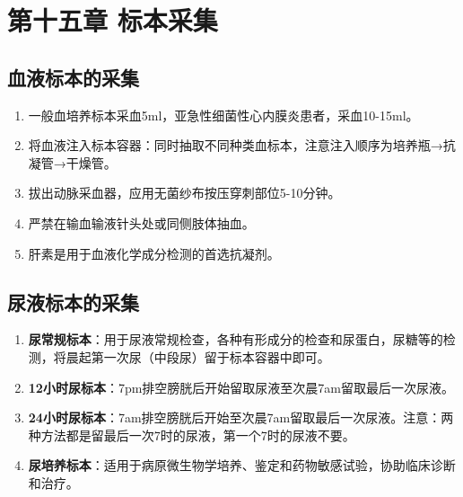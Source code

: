 \documentclass[11pt, a4paper]{ctexart}
\begin{document}
\section{第十五章 标本采集}
\subsection{血液标本的采集}
\begin{enumerate}
    \item 一般血培养标本采血5ml，亚急性细菌性心内膜炎患者，采血10-15ml。
    \item 将血液注入标本容器：同时抽取不同种类血标本，注意注入顺序为培养瓶→抗凝管→干燥管。
    \item 拔出动脉采血器，应用无菌纱布按压穿刺部位5-10分钟。
    \item 严禁在输血输液针头处或同侧肢体抽血。
    \item 肝素是用于血液化学成分检测的首选抗凝剂。
\end{enumerate}

\subsection{尿液标本的采集}
\begin{enumerate}
    \item \textbf{尿常规标本}：用于尿液常规检查，各种有形成分的检查和尿蛋白，尿糖等的检测，将晨起第一次尿（中段尿）留于标本容器中即可。
    \item \textbf{12小时尿标本}：7pm排空膀胱后开始留取尿液至次晨7am留取最后一次尿液。
    \item \textbf{24小时尿标本}：7am排空膀胱后开始至次晨7am留取最后一次尿液。注意：两种方法都是留最后一次7时的尿液，第一个7时的尿液不要。
    \item \textbf{尿培养标本}：适用于病原微生物学培养、鉴定和药物敏感试验，协助临床诊断和治疗。
\end{enumerate}
\end{document}
